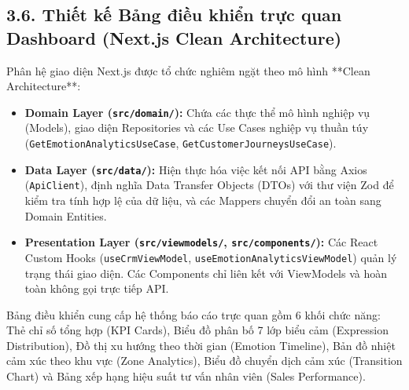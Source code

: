 \subsection*{3.6. Thiết kế Bảng điều khiển trực quan Dashboard (Next.js Clean Architecture)}

Phân hệ giao diện Next.js được tổ chức nghiêm ngặt theo mô hình **Clean Architecture**:
\begin{itemize}
    \item \textbf{Domain Layer (\texttt{src/domain/}):} Chứa các thực thể mô hình nghiệp vụ (Models), giao diện Repositories và các Use Cases nghiệp vụ thuần túy (\texttt{GetEmotionAnalyticsUseCase}, \texttt{GetCustomerJourneysUseCase}).
    \item \textbf{Data Layer (\texttt{src/data/}):} Hiện thực hóa việc kết nối API bằng Axios (\texttt{ApiClient}), định nghĩa Data Transfer Objects (DTOs) với thư viện Zod để kiểm tra tính hợp lệ của dữ liệu, và các Mappers chuyển đổi an toàn sang Domain Entities.
    \item \textbf{Presentation Layer (\texttt{src/viewmodels/}, \texttt{src/components/}):} Các React Custom Hooks (\texttt{useCrmViewModel}, \texttt{useEmotionAnalyticsViewModel}) quản lý trạng thái giao diện. Các Components chỉ liên kết với ViewModels và hoàn toàn không gọi trực tiếp API.
\end{itemize}

Bảng điều khiển cung cấp hệ thống báo cáo trực quan gồm 6 khối chức năng: Thẻ chỉ số tổng hợp (KPI Cards), Biểu đồ phân bố 7 lớp biểu cảm (Expression Distribution), Đồ thị xu hướng theo thời gian (Emotion Timeline), Bản đồ nhiệt cảm xúc theo khu vực (Zone Analytics), Biểu đồ chuyển dịch cảm xúc (Transition Chart) và Bảng xếp hạng hiệu suất tư vấn nhân viên (Sales Performance).

\newpage
